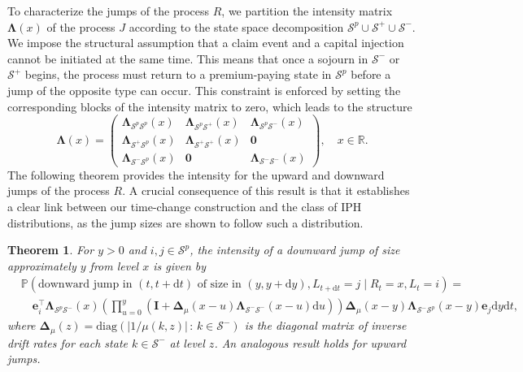 \documentclass[11pt]{article}
\numberwithin{table}{section}
\numberwithin{figure}{section}
\numberwithin{equation}{section}
\newcommand{\dd}{\mathrm{d}}
\newcommand{\1}{{\mathbf 1}}
\newcommand{\0}{\mat{0}}
\newtheorem{theorem}[lemma]{Theorem}
\begin{document}
To characterize the jumps of the process \(R\), we partition the intensity matrix \(\bm{\Lambda}(x)\) of the process \(J\) according to the state space decomposition \(\mathcal{S}^p \cup \mathcal{S}^+ \cup \mathcal{S}^-\). We impose the structural assumption that a claim event and a capital injection cannot be initiated at the same time. This means that once a sojourn in \(\mathcal{S}^-\) or \(\mathcal{S}^+\) begins, the process must return to a premium-paying state in \(\mathcal{S}^p\) before a jump of the opposite type can occur. This constraint is enforced by setting the corresponding blocks of the intensity matrix to zero, which leads to the structure
\[
\bm{\Lambda}(x) = \begin{pmatrix}
\bm{\Lambda}_{\mathcal{S}^p\mathcal{S}^p}(x) & \bm{\Lambda}_{\mathcal{S}^p\mathcal{S}^+}(x) & \bm{\Lambda}_{\mathcal{S}^p\mathcal{S}^-}(x) \\
\bm{\Lambda}_{\mathcal{S}^+\mathcal{S}^p}(x) & \bm{\Lambda}_{\mathcal{S}^+\mathcal{S}^+}(x) & \bm{0} \\
\bm{\Lambda}_{\mathcal{S}^-\mathcal{S}^p}(x) & \bm{0} & \bm{\Lambda}_{\mathcal{S}^-\mathcal{S}^-}(x)
\end{pmatrix},\quad x\in\mathbb{R}.
\]
The following theorem provides the intensity for the upward and downward jumps of the process \(R\). A crucial consequence of this result is that it establishes a clear link between our time-change construction and the class of IPH distributions, as the jump sizes are shown to follow such a distribution.
\begin{theorem}
\label{thm:jump_density_restructured}
For \(y > 0\) and \(i,j \in \mathcal{S}^p\), the intensity of a downward jump of size approximately \(y\) from level \(x\) is given by
\begin{align*}
&\mathbb{P}(\text{downward jump in }(t, t+\dd t)\text{ of size in }(y, y+\dd y), L_{t+\dd t}=j \mid R_t=x, L_t=i) = \\
&\quad \bm{e}_i^\intercal \bm{\Lambda}_{\mathcal{S}^p\mathcal{S}^-}(x) \left( \prod_{u=0}^y (\bm{I} + \bm{\Delta}_\mu(x-u)\bm{\Lambda}_{\mathcal{S}^-\mathcal{S}^-}(x-u)\dd u) \right) \bm{\Delta}_\mu(x-y)\bm{\Lambda}_{\mathcal{S}^-\mathcal{S}^p}(x-y) \bm{e}_j \dd y \dd t,
\end{align*}
where \(\bm{\Delta}_\mu(z) = \text{diag}(|1/\mu(k,z)|\,:\,k\in \mathcal{S}^-)\) is the diagonal matrix of inverse drift rates for each state \(k \in \mathcal{S}^-\) at level \(z\). An analogous result holds for upward jumps.
\end{theorem}
\end{document}
